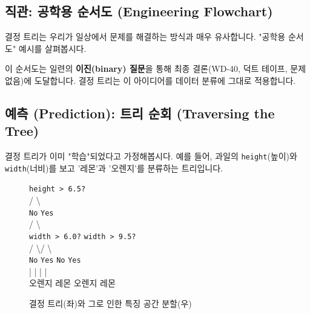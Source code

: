 \documentclass[11pt,a4paper]{book}
\theoremstyle{definition}
\begin{document}
\subsection{직관: 공학용 순서도 (Engineering Flowchart)}
결정 트리는 우리가 일상에서 문제를 해결하는 방식과 매우 유사합니다.
"공학용 순서도" 예시를 살펴봅시다.


이 순서도는 일련의 \textbf{이진(binary) 질문}을 통해 최종 결론(WD-40, 덕트 테이프, 문제 없음)에 도달합니다.
결정 트리는 이 아이디어를 데이터 분류에 그대로 적용합니다.

\subsection{예측 (Prediction): 트리 순회 (Traversing the Tree)}

결정 트리가 이미 "학습"되었다고 가정해봅시다.
예를 들어, 과일의 \texttt{height}(높이)와 \texttt{width}(너비)를 보고 '레몬'과 '오렌지'를 분류하는 트리입니다.

\begin{figure}[h!]
    \centering
    \caption{결정 트리(좌)와 그로 인한 특징 공간 분할(우)}
    \label{fig:tree_and_space}
    \begin{minipage}{0.45\textwidth}
        \centering
        \texttt{height > 6.5?} \\
        / \qquad \qquad \textbackslash \\
        \texttt{No} \qquad \qquad \texttt{Yes} \\
        / \qquad \qquad \qquad \textbackslash \\
        \texttt{width > 6.0?} \qquad \texttt{width > 9.5?} \\
        / \quad \textbackslash \qquad \qquad / \quad \textbackslash \\
        \texttt{No} \quad \texttt{Yes} \qquad \texttt{No} \quad \texttt{Yes} \\
        | \qquad | \qquad \qquad | \qquad | \\
        오렌지 \quad 레몬 \qquad 오렌지 \quad 레몬
    \end{minipage}
    \begin{minipage}{0.45\textwidth}
        \centering
    \end{minipage}
\end{figure}
\end{document}
